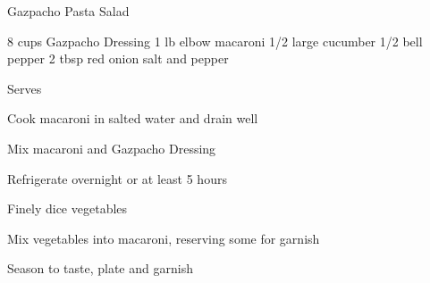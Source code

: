 \begin{recipe}{Gazpacho Pasta Salad}{}
\begin{ingredients}
8 cups Gazpacho Dressing
1 lb elbow macaroni
1/2 large cucumber
1/2 bell pepper
2 tbsp red onion
salt and pepper
\end{ingredients}
\nextcolumn
Serves
\begin{steps}
    \item Cook macaroni in salted water and drain well
    \item Mix macaroni and Gazpacho Dressing
    \item Refrigerate overnight or at least 5 hours
    \item Finely dice vegetables
    \item Mix vegetables into macaroni, reserving some for garnish
    \item  Season to taste, plate and garnish
\end{steps}
\end{recipe}